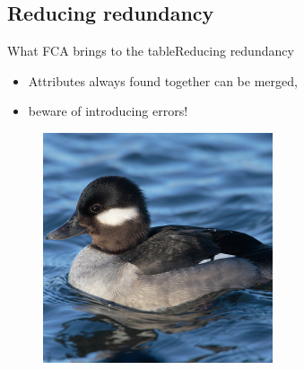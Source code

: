 \subsection{Reducing redundancy}
\begin{frame}{What FCA brings to the table}{Reducing redundancy}

\begin{itemize}
\item Attributes always found together can be merged,
\item<2-> beware of introducing errors!
\end{itemize}

\begin{figure}[ht]
  \begin{minipage}[t]{0.3\linewidth}
    \vspace{0pt}
    \centering
    \includegraphics[width=\textwidth]{img/fca/duck1}
    \\ \color{green}{\footnotesize $hasBill(x) \wedge isDuck(x)$}
  \end{minipage}
  \hfill
  \begin{minipage}[t]{0.3\linewidth}
    \vspace{0pt}
    \centering

\end{minipage}
\end{figure}
\end{frame}
